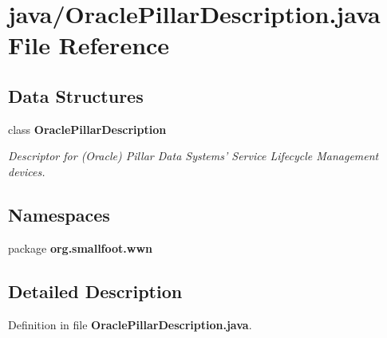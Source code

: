 \section{java/\-Oracle\-Pillar\-Description.java \-File \-Reference}
\label{OraclePillarDescription_8java}
\subsection*{\-Data \-Structures}
\begin{DoxyCompactItemize}
\item 
class {\bf \-Oracle\-Pillar\-Description}
\begin{DoxyCompactList}\small\item\em \-Descriptor for (\-Oracle) \-Pillar \-Data \-Systems' \-Service \-Lifecycle \-Management devices. \end{DoxyCompactList}\end{DoxyCompactItemize}
\subsection*{\-Namespaces}
\begin{DoxyCompactItemize}
\item 
package {\bf org.\-smallfoot.\-wwn}
\end{DoxyCompactItemize}


\subsection{\-Detailed \-Description}


\-Definition in file {\bf \-Oracle\-Pillar\-Description.\-java}.

